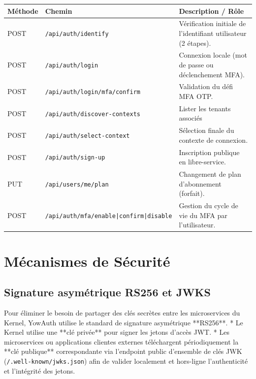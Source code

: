 \documentclass[
]{IPLeiriaThesis}
\newcommand{\code}[1]{\texttt{\small #1}}
\begin{document}
\begin{center}
\small
\begin{longtable}{@{}p{1.2cm}p{6cm}p{7cm}@{}}
\toprule
\textbf{Méthode} & \textbf{Chemin} & \textbf{Description / Rôle} \\
\midrule
POST & \code{/api/auth/identify} & Vérification initiale de l'identifiant utilisateur (2 étapes). \\
POST & \code{/api/auth/login} & Connexion locale (mot de passe ou déclenchement MFA). \\
POST & \code{/api/auth/login/mfa/confirm} & Validation du défi MFA OTP. \\
POST & \code{/api/auth/discover-contexts} & Lister les tenants associés \\
POST & \code{/api/auth/select-context} & Sélection finale du contexte de connexion. \\
POST & \code{/api/auth/sign-up} & Inscription publique en libre-service. \\
PUT  & \code{/api/users/me/plan} & Changement de plan d'abonnement (forfait). \\
POST & \code{/api/auth/mfa/enable|confirm|disable} & Gestion du cycle de vie du MFA par l'utilisateur. \\
\bottomrule
\end{longtable}
\end{center}

\section{Mécanismes de Sécurité}

\subsection{Signature asymétrique RS256 et JWKS}
Pour éliminer le besoin de partager des clés secrètes entre les microservices du Kernel, YowAuth utilise le standard de signature asymétrique **RS256**. 
* Le Kernel utilise une **clé privée** pour signer les jetons d'accès JWT.
* Les microservices ou applications clientes externes téléchargent périodiquement la **clé publique** correspondante via l'endpoint public d'ensemble de clés JWK (\code{/.well-known/jwks.json}) afin de valider localement et hors-ligne l'authenticité et l'intégrité des jetons.
\end{document}
